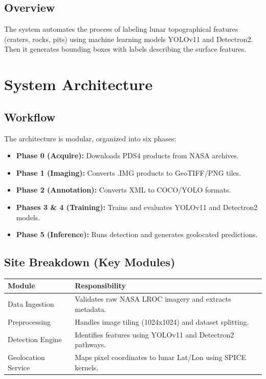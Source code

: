 \documentclass[12pt]{article}
\begin{document}
\subsection{Overview}
The system automates the process of labeling lunar topographical features (craters, rocks, pits) using machine learning models YOLOv11 and Detectron2. Then it generates bounding boxes with labels describing the surface features.

\section{System Architecture}
\subsection{Workflow}
The architecture is modular, organized into six phases:
\begin{itemize}
    \item \textbf{Phase 0 (Acquire):} Downloads PDS4 products from NASA archives.
    \item \textbf{Phase 1 (Imaging):} Converts .IMG products to GeoTIFF/PNG tiles.
    \item \textbf{Phase 2 (Annotation):} Converts XML to COCO/YOLO formats.
    \item \textbf{Phases 3 \& 4 (Training):} Trains and evaluates YOLOv11 and Detectron2 models.
    \item \textbf{Phase 5 (Inference):} Runs detection and generates geolocated predictions.
\end{itemize}

\subsection{Site Breakdown (Key Modules)}
\begin{tabularx}{\textwidth}{l|X}
\toprule
\textbf{Module} & \textbf{Responsibility} \\ \midrule
Data Ingestion & Validates raw NASA LROC imagery and extracts metadata. \\
Preprocessing & Handles image tiling (1024x1024) and dataset splitting. \\
Detection Engine & Identifies features using YOLOv11 and Detectron2 pathways. \\
Geolocation Service & Maps pixel coordinates to lunar Lat/Lon using SPICE kernels. \\
\bottomrule
\end{tabularx}
\end{document}
